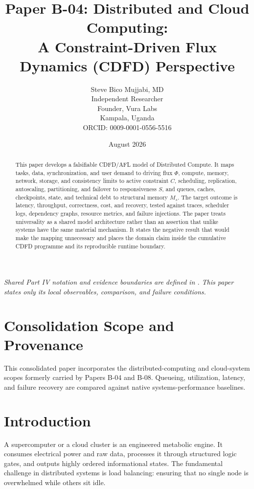 \documentclass[11pt,a4paper]{article}
\title{\textbf{Paper B-04: Distributed and Cloud Computing:\\ A Constraint-Driven Flux Dynamics (CDFD) Perspective}}
\author{Steve Bico Mujjabi, MD\\
\small Independent Researcher\\
\small Founder, Vura Labs\\
\small Kampala, Uganda\\
\small ORCID: 0009-0001-0556-5516}
\date{August 2026}
\begin{document}
\maketitle

\noindent\textit{Shared Part IV notation and evidence boundaries are defined in . This paper states only its local observables, comparison, and failure conditions.}


\begin{abstract}
This paper develops a falsifiable CDFD/AFL model of Distributed Compute. It maps tasks, data, synchronization, and user demand to driving flux $\Phi$, compute, memory, network, storage, and consistency limits to active constraint $C$, scheduling, replication, autoscaling, partitioning, and failover to responsiveness $S$, and queues, caches, checkpoints, state, and technical debt to structural memory $M_s$. The target outcome is latency, throughput, correctness, cost, and recovery, tested against traces, scheduler logs, dependency graphs, resource metrics, and failure injections. The paper treats universality as a shared model architecture rather than an assertion that unlike systems have the same material mechanism. It states the negative result that would make the mapping unnecessary and places the domain claim inside the cumulative CDFD programme and its reproducible runtime boundary.
\end{abstract}
\section*{Consolidation Scope and Provenance}
This consolidated paper incorporates the distributed-computing and cloud-system scopes formerly carried by Papers B-04 and B-08. Queueing, utilization, latency, and failure recovery are compared against native systems-performance baselines.


\section{Introduction}

A supercomputer or a cloud cluster is an engineered metabolic engine. It consumes electrical power and raw data, processes it through structured logic gates, and outputs highly ordered informational states. The fundamental challenge in distributed systems is load balancing: ensuring that no single node is overwhelmed while others sit idle.
\end{document}
